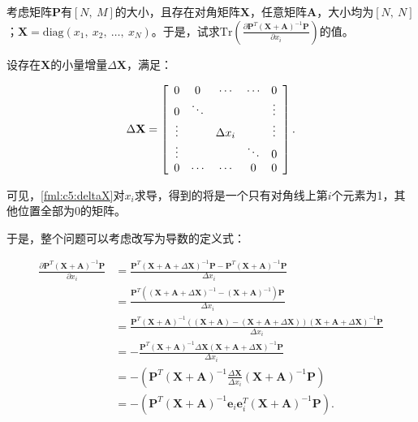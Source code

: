 \begin{example}\label{exm:c5:invMatr}
	考虑矩阵$\mathbf{P}$有$[N,~M]$的大小，且存在对角矩阵$\mathbf{X}$，任意矩阵$\mathbf{A}$，大小均为$[N,~N]$；$\mathbf{X}=\mathrm{diag}{( x_1,~x_2,~\ldots,~x_N )}$。于是，试求$\mathrm{Tr}\left( \frac{\partial \mathbf{P}^T (\mathbf{X}+\mathbf{A})^{-1} \mathbf{P} }{\partial x_i} \right)$的值。
	
	设存在$\mathbf{X}$的小量增量$\Delta \mathbf{X}$，满足：
	
	\begin{equation}\label{fml:c5:deltaX}
		\Delta \mathbf{X} = \left[
		\begin{array}{c c c c c}
			0 & 0 & \cdots & \cdots & 0 \\
			0 & \ddots &   &  & \vdots \\
			\vdots &   & \Delta x_i & & \vdots \\
			\vdots &   &   & \ddots & 0 \\
			0 & \cdots & \cdots & 0 & 0 \\
		\end{array}
		\right].
	\end{equation}
	
	可见，\eqref{fml:c5:deltaX}对$x_i$求导，得到的将是一个只有对角线上第$i$个元素为1，其他位置全部为0的矩阵。
	
	于是，整个问题可以考虑改写为导数的定义式：
	
	\begin{equation}\label{fml:c5:SpsDictLMRPar2}
		\begin{aligned}
			\frac{\partial \mathbf{P}^T (\mathbf{X}+\mathbf{A})^{-1} \mathbf{P} }{\partial x_i} &= \frac{\mathbf{P}^T (\mathbf{X}+\mathbf{A}+\Delta \mathbf{X})^{-1} \mathbf{P} - \mathbf{P}^T (\mathbf{X}+\mathbf{A})^{-1} \mathbf{P} }{\Delta x_i}\\
			&= \frac{\mathbf{P}^T \left( (\mathbf{X}+\mathbf{A}+\Delta \mathbf{X})^{-1} - (\mathbf{X}+\mathbf{A})^{-1} \right) \mathbf{P} }{\Delta x_i}\\
			&= \frac{\mathbf{P}^T (\mathbf{X}+\mathbf{A})^{-1}\left( (\mathbf{X}+\mathbf{A}) - (\mathbf{X}+\mathbf{A}+\Delta \mathbf{X}) \right) (\mathbf{X}+\mathbf{A}+\Delta \mathbf{X})^{-1} \mathbf{P} }{\Delta x_i}\\
			&= -\frac{\mathbf{P}^T (\mathbf{X}+\mathbf{A})^{-1} \Delta \mathbf{X} (\mathbf{X}+\mathbf{A}+\Delta \mathbf{X})^{-1} \mathbf{P} }{\Delta x_i}\\
			&= - \left( \mathbf{P}^T (\mathbf{X}+\mathbf{A})^{-1} \frac{\Delta \mathbf{X}}{\Delta x_i} (\mathbf{X}+\mathbf{A})^{-1} \mathbf{P} \right)\\
			&= - \left( \mathbf{P}^T (\mathbf{X}+\mathbf{A})^{-1} \mathbf{e}_i \mathbf{e}_i^T (\mathbf{X}+\mathbf{A})^{-1} \mathbf{P} \right).
		\end{aligned}
	\end{equation}
	

\end{example}
